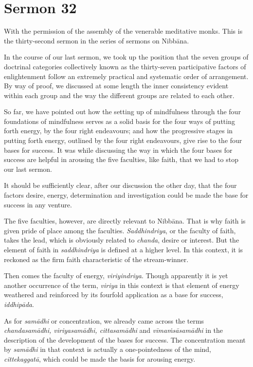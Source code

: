 \chapter{Sermon 32}

\NibbanaOpeningQuote

With the permission of the assembly of the venerable meditative monks. This is the thirty-second sermon in the series of sermons on Nibbāna.

In the course of our last sermon, we took up the position that the seven groups of doctrinal categories collectively known as the thirty-seven participative factors of enlightenment follow an extremely practical and systematic order of arrangement. By way of proof, we discussed at some length the inner consistency evident within each group and the way the different groups are related to each other.

So far, we have pointed out how the setting up of mindfulness through the four foundations of mindfulness serves as a solid basis for the four ways of putting forth energy, by the four right endeavours; and how the progressive stages in putting forth energy, outlined by the four right endeavours, give rise to the four bases for success. It was while discussing the way in which the four bases for success are helpful in arousing the five faculties, like faith, that we had to stop our last sermon.

It should be sufficiently clear, after our discussion the other day, that the four factors desire, energy, determination and investigation could be made the base for success in any venture.

The five faculties, however, are directly relevant to Nibbāna. That is why faith is given pride of place among the faculties. \emph{Saddhindriya}, or the faculty of faith, takes the lead, which is obviously related to \emph{chanda}, desire or interest. But the element of faith in \emph{saddhindriya} is defined at a higher level. In this context, it is reckoned as the firm faith characteristic of the stream-winner.

Then comes the faculty of energy, \emph{viriyindriya}. Though apparently it is yet another occurrence of the term, \emph{viriya} in this context is that element of energy weathered and reinforced by its fourfold application as a base for success, \emph{iddhipāda}.

As for \emph{samādhi} or concentration, we already came across the terms \emph{chandasamādhi, viriyasamādhi, cittasamādhi} and \emph{vīmaṁsāsamādhi} in the description of the development of the bases for success. The concentration meant by \emph{samādhi} in that context is actually a one-pointedness of the mind, \emph{cittekaggatā}, which could be made the basis for arousing energy.

